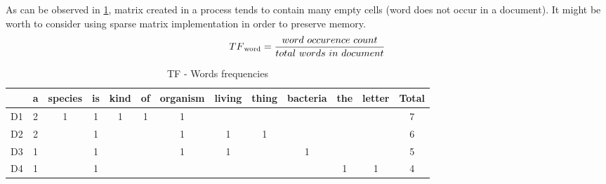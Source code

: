 \begin{itemize}
	As can be observed in \ref{tf_idf_tf_freq}, matrix created in a process tends to contain many empty cells (word does not occur in a document). It might be worth to consider using sparse matrix implementation in order to preserve memory.
	\[TF\textsubscript{word}=\frac{word\ occurence\ count}{total\ words\ in\ document}\]	
\begin{table}[H]
	\centering
	\caption{TF - Words frequencies}
	\label{tf_idf_tf_freq}
	\begin{tabular}{@{}lccccccccccc|c|@{}}
		\toprule
		& \multicolumn{1}{l}{a} & \multicolumn{1}{l}{species} & \multicolumn{1}{l}{is} & \multicolumn{1}{l}{kind} & \multicolumn{1}{l}{of} & \multicolumn{1}{l}{organism} & \multicolumn{1}{l}{living} & \multicolumn{1}{l}{thing} & \multicolumn{1}{l}{bacteria} & \multicolumn{1}{l}{the} & \multicolumn{1}{l|}{letter} & \multicolumn{1}{l|}{Total} \\ \midrule
		D1 & 2                     & 1                           & 1                      & 1                        & 1                      & 1                            &                            &                           &                              &                         &                             & 7                          \\ \cmidrule(l){13-13} 
		D2 & 2                     &                             & 1                      &                          &                        & 1                            & 1                          & 1                         &                              &                         &                             & 6                          \\ \cmidrule(l){13-13} 
		D3 & 1                     &                             & 1                      &                          &                        & 1                            & 1                          &                           & 1                            &                         &                             & 5                          \\ \cmidrule(l){13-13} 
		D4 & 1                     &                             & 1                      &                          &                        &                              &                            &                           &                              & 1                       & 1                           & 4                          \\ \bottomrule
	\end{tabular}
\end{table}

\end{itemize}
